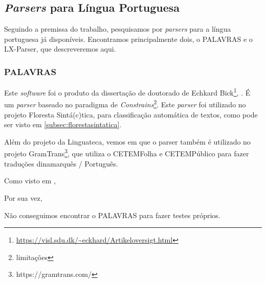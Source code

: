 \subsection{\textit{Parsers} para Língua Portuguesa}
\label{parser_portugues}
Seguindo a premissa do trabalho, pesquisamos por \textit{parsers} para a língua portuguesa já disponíveis. Encontramos principalmente dois, o PALAVRAS e o LX-Parser, que descreveremos aqui.


\subsubsection{PALAVRAS}\label{subsec:palavras}
Este \textit{software} foi o produto da dissertação de doutorado de Echkard Bick\footnote{\url{https://visl.sdu.dk/~eckhard/Artikeloversigt.html}}, . É um \textit{parser} baseado no paradigma de \textit{Constrains}\footnote{limitações}. Este \textit{parser} foi utilizado no projeto Floresta Sintá(c)tica, para classificação automática de textos, como pode ser visto em \ref{subsec:florestasintatica}.

Além do projeto da Linguateca, vemos em  que o parser também é utilizado no projeto GramTrans\footnote{https://gramtrans.com/}, que utiliza o CETEMFolha e CETEMPúblico para fazer traduções dinamarquês / Português.

Como visto em , 
\begin{quote}
\end{quote}
Por sua vez,
\begin{quote}
\end{quote}
Não conseguimos encontrar o PALAVRAS para fazer testes próprios.

